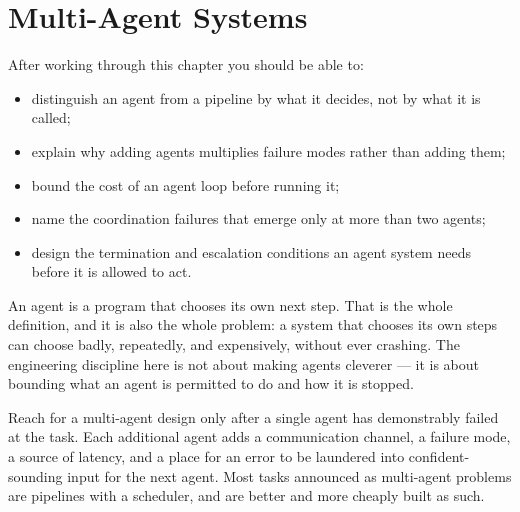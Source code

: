 
\chapter{Multi-Agent Systems}


\label{ch:multi-agent-systems}

\begin{learningobjectives}
After working through this chapter you should be able to:
\begin{itemize}
  \item distinguish an agent from a pipeline by what it decides, not by what
        it is called;
  \item explain why adding agents multiplies failure modes rather than adding
        them;
  \item bound the cost of an agent loop before running it;
  \item name the coordination failures that emerge only at more than two
        agents;
  \item design the termination and escalation conditions an agent system needs
        before it is allowed to act.
\end{itemize}
\end{learningobjectives}

\begin{plainlanguage}
An agent is a program that chooses its own next step. That is the whole
definition, and it is also the whole problem: a system that chooses its own
steps can choose badly, repeatedly, and expensively, without ever crashing. The
engineering discipline here is not about making agents cleverer --- it is about
bounding what an agent is permitted to do and how it is stopped.
\end{plainlanguage}

\begin{engineernote}
Reach for a multi-agent design only after a single agent has demonstrably
failed at the task. Each additional agent adds a communication channel, a
failure mode, a source of latency, and a place for an error to be laundered
into confident-sounding input for the next agent. Most tasks announced as
multi-agent problems are pipelines with a scheduler, and are better and more
cheaply built as such.
\end{engineernote}

